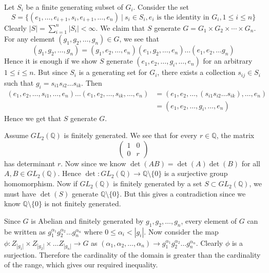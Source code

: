 \documentclass[12pt]{exam}
\theoremstyle{plain} %
\theoremstyle{definition} %
\theoremstyle{remark} %
\begin{document}
\begin{questions}
  \question
  \begin{solution}
    Let $S_i$ be a finite generating subset of $G_i$. Consider the set 
    $$S = \{ (e_1, \ldots, e_{i+1}, s_i, e_{i+1}, \ldots, e_n )  \ \big| \  s_i \in S_i, e_i \textrm{ is the identity in } G_i, 1 \le i \le n \}$$
    Clearly $|S| = \sum_{i = 1}^{n} |S_i| < \infty$. We claim that $S$ generate $G = G_1 \times G_2 \times \cdots \times G_n$. For any element $(g_1 , g_2 , \ldots , g_n) \in G$, we see that $$(g_1 , g_2 , \ldots , g_n) = (g_1, e_2, \ldots, e_n)(e_1, g_2, \ldots , e_n) \ldots (e_1, e_2, \ldots g_n)$$
    Hence it is enough if we show $S$ generate $(e_1, e_2, \ldots, g_i, \ldots , e_n)$ for an arbitrary $1\le i \le n$. 
    But since $S_i$ is a generating set for $G_i$, there exists a collection $s_{ij} \in S_i$ such that $g_i = s_{i1}s_{i2}\ldots s_{ik}$. Then \begin{align*}(e_1, e_2, \ldots, s_{i1}, \ldots, e_n)\ldots(e_1, e_2, \ldots, s_{ik}, \ldots, e_n) &= (e_1, e_2, \ldots, (s_{i1}s_{i2}\ldots s_{ik}), \ldots, e_n) \\ 
    &= (e_1, e_2, \ldots, g_i, \ldots, e_n)
    \end{align*}
    Hence we get that $S$ generate $G$.
  \end{solution}

  \question
  \begin{solution}
    Assume $GL_2(\mathbb{Q})$ is finitely generated. We see that for every $r \in \mathbb{Q}$, the matrix \[
    \begin{pmatrix}
      1 & 0 \\
      0 & r
    \end{pmatrix}
  \]
    has determinant $r$. Now since we know $\det(AB) = \det(A)\det(B)$ for all $A, B \in GL_2(\mathbb{Q})$. Hence $\det: GL_2(\mathbb{Q}) \to \mathbb{Q}\setminus \{ 0 \}$ is a surjective group homomorphism. Now if $GL_2(\mathbb{Q})$ is finitely generated by a set $S \subset GL_2(\mathbb{Q})$, we must have $\det(S)$ generate $\mathbb{Q} \setminus \{ 0 \}$. But this gives a contradiction since we know $\mathbb{Q} \setminus \{ 0 \}$ is not finitely generated.
  \end{solution}

  \question
  \begin{solution}
    Since $G$ is Abelian and finitely generated by $g_1 , g_2 , \ldots , g_n$, every element of $G$ can be written as $g_1^{\alpha_1}g_2^{\alpha_2}\ldots g_n^{\alpha_n}$ where $0 \le \alpha_i < |g_i|$. 
    Now consider the map $\phi: Z_{|g_1|}\times Z_{|g_2|} \times \ldots Z_{|g_n|} \to G$ as $(\alpha_1, \alpha_{2}, \ldots, \alpha_n) \to g_1^{\alpha_1}g_2^{\alpha_2}\ldots g_n^{\alpha_n}$. Clearly $\phi$ is a surjection. Therefore the cardinality of the domain is greater than the cardinality of the range, which gives our required inequality.
  \end{solution}


\end{questions}
\end{document}
